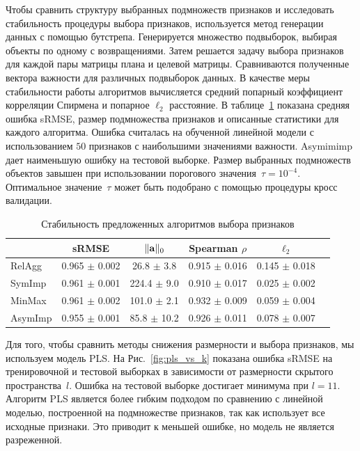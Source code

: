 Чтобы сравнить структуру выбранных подмножеств признаков и исследовать стабильность процедуры выбора признаков, используется метод генерации данных с помощью бутстрепа. 
Генерируется множество подвыборок, выбирая объекты по одному с возвращениями. 
Затем решается задачу выбора признаков для каждой пары матрицы плана и целевой матрицы.
Сравниваются полученные вектора важности для различных подвыборок данных. 
В качестве меры стабильности работы алгоритмов вычисляется средний попарный коэффициент корреляции Спирмена и попарное $\ell_2$ расстояние.
В таблице~\ref{tbl:stability} показана средняя ошибка sRMSE, размер подмножества признаков и описанные статистики для каждого алгоритма. 
Ошибка считалась на обученной линейной модели с использованием $50$ признаков с наибольшими значениями важности.
Asymimimp дает наименьшую ошибку на тестовой выборке. 
Размер выбранных подмножеств объектов завышен при использовании порогового значения~$\tau=10^{-4}$. 
Оптимальное значение~$\tau$ может быть подобрано с помощью процедуры кросс валидации.

\begin{table}[ht]
	\caption{Стабильность предложенных алгоритмов выбора признаков}
	\centering
	\begin{tabular}{l|ccccc}
		\hline
		& sRMSE  & $\|\mathbf{a}\|_0$ & Spearman $\rho$ & $\ell_2$ \\ \hline
		RelAgg & 0.965 $\pm$ 0.002 & 26.8 $\pm$ 3.8 & 0.915 $\pm$ 0.016 & 0.145 $\pm$ 0.018   \\
		SymImp & 0.961 $\pm$ 0.001 & 224.4 $\pm$ 9.0 & 0.910 $\pm$ 0.017 & 0.025 $\pm$ 0.002   \\
		MinMax & 0.961 $\pm$ 0.002 & 101.0 $\pm$ 2.1& 0.932 $\pm$ 0.009 & 0.059 $\pm$ 0.004   \\
		AsymImp & 0.955 $\pm$ 0.001 & 85.8 $\pm$ 10.2& 0.926 $\pm$ 0.011 & 0.078 $\pm$ 0.007  \\ \hline
	\end{tabular}
	\label{tbl:stability}
\end{table}

Для того, чтобы сравнить методы снижения размерности и выбора признаков, мы используем модель PLS. 
На Рис.~\ref{fig:pls_vs_k} показана ошибка sRMSE на тренировочной и тестовой выборках в зависимости от размерности скрытого пространства~$l$.
Ошибка на тестовой выборке достигает минимума при $l = 11$.
Алгоритм PLS является более гибким подходом по сравнению с линейной моделью, построенной на подмножестве признаков, так как использует все исходные признаки.
Это приводит к меньшей ошибке, но модель не является разреженной.

